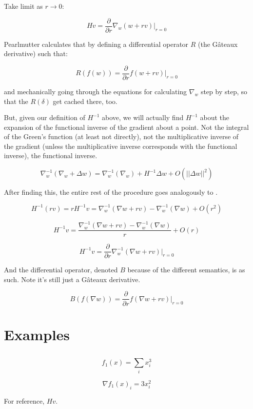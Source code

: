 \documentclass{article}
\begin{document}
Take limit as $r \rightarrow 0$:

$$Hv = \frac{\partial}{\partial r} \nabla_w (w + rv) |_{r=0}$$

Pearlmutter calculates that by defining a differential operator $R$ (the G\^{a}teaux derivative\cite{gateaux1913}) such that:

$$R(f(w)) = \frac{\partial}{\partial r} f(w + rv)|_{r=0}$$

and mechanically going through the equations for calculating $\nabla_w$ step by step, so that the $R(\delta)$ get cached there, too.

But, given our definition of $H^{-1}$ above, we will actually find $H^{-1}$ about the expansion of the functional inverse of the gradient about a point. Not the integral of the Green's function (at least not directly), not the multiplicative inverse of the gradient (unless the multiplicative inverse corresponds with the functional inverse), the functional inverse.

$$\nabla_w^{-1} (\nabla_w + \Delta w) = \nabla_w^{-1} (\nabla_w) + H^{-1} \Delta w + O(||\Delta w||^2)$$

After finding this, the entire rest of the procedure goes analogously to \cite{pearlmutter1994}.

$$H^{-1}(rv) = rH^{-1}v = \nabla_w^{-1}(\nabla w + rv) - \nabla_w^{-1}(\nabla w) + O(r^2)$$

$$H^{-1}v = \frac{\nabla_w^{-1}(\nabla w + rv) - \nabla_w^{-1}(\nabla w)}{r} + O(r)$$

$$H^{-1}v = \frac{\partial}{\partial r} \nabla_w^{-1} (\nabla w + rv) |_{r=0}$$

And the differential operator, denoted $B$ because of the different semantics, is as such. Note it's still just a G\^{a}teaux derivative.

$$B(f(\nabla w)) = \frac{\partial}{\partial r} f(\nabla w + rv)|_{r=0}$$

\section{Examples}

\subsection{}

$$ f_1(x) = \sum_i x_i^3 $$

$$ \nabla f_1(x)_i = 3 x_i^2 $$

For reference, $Hv$.
\end{document}
